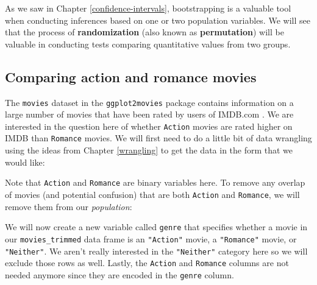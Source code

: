 \documentclass[12pt,]{krantz}
\makeatletter
\newenvironment{Shaded}{\begin{snugshade}}{\end{snugshade}}
\newcommand{\KeywordTok}[1]{\textcolor[rgb]{0.27,0.27,0.27}{\textbf{#1}}}
\newcommand{\DecValTok}[1]{\textcolor[rgb]{0.06,0.06,0.06}{#1}}
\newcommand{\StringTok}[1]{\textcolor[rgb]{0.5,0.5,0.5}{#1}}
\newcommand{\OperatorTok}[1]{\textcolor[rgb]{0.43,0.43,0.43}{\textbf{#1}}}
\newcommand{\NormalTok}[1]{#1}
\newenvironment{kframe}{%
\medskip{}
\setlength{\fboxsep}{.8em}
 \def\at@end@of@kframe{}%
 \ifinner\ifhmode%
  \def\at@end@of@kframe{\end{minipage}}%
  \begin{minipage}{\columnwidth}%
 \fi\fi%
 \def\FrameCommand##1{\hskip\@totalleftmargin \hskip-\fboxsep
 \colorbox{shadecolor}{##1}\hskip-\fboxsep
     \hskip-\linewidth \hskip-\@totalleftmargin \hskip\columnwidth}%
 \MakeFramed {\advance\hsize-\width
   \@totalleftmargin\z@ \linewidth\hsize
   \@setminipage}}%
 {\par\unskip\endMakeFramed%
 \at@end@of@kframe}
\renewenvironment{Shaded}{\begin{kframe}}{\end{kframe}}
\theoremstyle{definition}
\theoremstyle{definition}
\theoremstyle{definition}
\theoremstyle{remark}
\makeatother
\begin{document}
As we saw in Chapter \ref{confidence-intervals}, bootstrapping is a
valuable tool when conducting inferences based on one or two population
variables. We will see that the process of \textbf{randomization} (also
known as \textbf{permutation}) will be valuable in conducting tests
comparing quantitative values from two groups.

\subsection{Comparing action and romance
movies}\label{comparing-action-and-romance-movies}

The \texttt{movies} dataset in the \texttt{ggplot2movies} package
contains information on a large number of movies that have been rated by
users of IMDB.com \citep{R-ggplot2movies}. We are interested in the
question here of whether \texttt{Action} movies are rated higher on IMDB
than \texttt{Romance} movies. We will first need to do a little bit of
data wrangling using the ideas from Chapter \ref{wrangling} to get the
data in the form that we would like:

\begin{Shaded}
\end{Shaded}

Note that \texttt{Action} and \texttt{Romance} are binary variables
here. To remove any overlap of movies (and potential confusion) that are
both \texttt{Action} and \texttt{Romance}, we will remove them from our
\emph{population}:

\begin{Shaded}
\end{Shaded}

We will now create a new variable called \texttt{genre} that specifies
whether a movie in our \texttt{movies\_trimmed} data frame is an
\texttt{"Action"} movie, a \texttt{"Romance"} movie, or
\texttt{"Neither"}. We aren't really interested in the
\texttt{"Neither"} category here so we will exclude those rows as well.
Lastly, the \texttt{Action} and \texttt{Romance} columns are not needed
anymore since they are encoded in the \texttt{genre} column.
\end{document}
